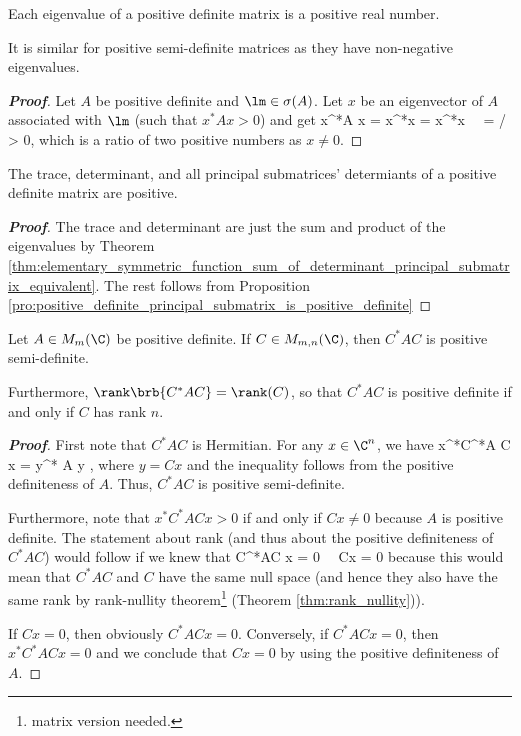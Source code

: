 \begin{proposition}\label{pro:positive_definite_matrix_positive_eigenvalue}
Each eigenvalue of a positive definite matrix is a positive real number. %

It is similar for positive semi-definite matrices as they have non-negative eigenvalues.
\end{proposition}

\begin{proof}[\bf Proof]
Let $A$ be positive definite and $\lm \in \sigma(A)$. Let $x$ be an eigenvector of $A$ associated with $\lm$ (such that $x^*A x >0$) and get
\be
x^*A x = x^*\lm x = \lm x^*x \ \ra \ \lm = / > 0,
\ee
which is a ratio of two positive numbers as $x\neq 0$.
\end{proof}



\begin{proposition}
The trace, determinant, and all principal submatrices' determiants of a positive definite matrix are positive.
\end{proposition}

\begin{proof}[\bf Proof]
The trace and determinant are just the sum and product of the eigenvalues by Theorem \ref{thm:elementary_symmetric_function_sum_of_determinant_principal_submatrix_equivalent}. The rest follows from Proposition \ref{pro:positive_definite_principal_submatrix_is_positive_definite}
\end{proof}


\begin{proposition}\label{pro:product_rank_positive_definite}
Let $A\in M_m(\C)$ be positive definite. If $C\in M_{m,n}(\C)$, then $C^*AC$ is positive semi-definite.

Furthermore, $\rank\brb{C^*AC} = \rank(C)$, so that $C^*AC$ is positive definite if and only if $C$ has rank $n$.
\end{proposition}


\begin{proof}[\bf Proof]    %
First note that $C^*AC$ is Hermitian. For any $x\in \C^n$, we have
\be
x^*C^*A C x = y^* A y ,
\ee
where $y = Cx$ and the inequality follows from the positive definiteness of $A$. Thus, $C^*AC$ is positive semi-definite.

Furthermore, note that $x^*C^*ACx >0$ if and only if $Cx \neq 0$ because $A$ is positive definite. The statement about rank (and thus about the positive definiteness of $C^*AC$) would follow if we knew that
\be
C^*AC x = 0 \ \lra \ Cx = 0
\ee
because this would mean that $C^*AC$ and $C$ have the same null space (and hence they also have the same rank by rank-nullity theorem\footnote{matrix version needed.} (Theorem \ref{thm:rank_nullity})).

If $Cx = 0$, then obviously $C^*ACx = 0$. Conversely, if $C^*ACx = 0$, then $x^*C^*AC x = 0$ and we conclude that $Cx = 0$ by using the positive definiteness of $A$.
\end{proof}


